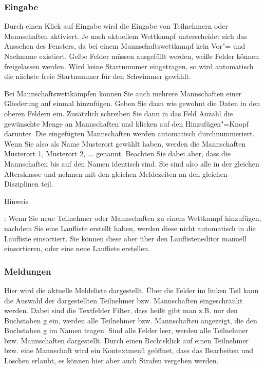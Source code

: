\documentclass[11pt,a4paper,twoside,ngerman]{article}
\begin{document}
\subsubsection*{Eingabe}
Durch einen Klick auf \glqq{}Eingabe\grqq{} wird die Eingabe von Teilnehmern oder Mannschaften aktiviert. Je nach aktuellem Wettkampf unterscheidet sich das Aussehen des Fensters, da bei einem Mannschaftswettkampf kein Vor"= und Nachname existiert. Gelbe Felder müssen ausgefüllt werden, weiße Felder können freigelassen werden. Wird keine Startnummer eingetragen, so wird automatisch die nächste freie Startnummer für den Schwimmer gewählt.

Bei Mannschaftswettkämpfen können Sie auch mehrere Mannschaften einer Gliederung auf einmal hinzufügen. Geben Sie dazu wie gewohnt die Daten in den oberen Feldern ein. Zusätzlich schreiben Sie dann in das Feld Anzahl die gewünschte Menge an Mannschaften und klicken auf den Hinzufügen"=Knopf darunter. Die eingefügten Mannschaften werden automatisch durchnummeriert. Wenn Sie also als Name \glqq{}Musterort\grqq{} gewählt haben, werden die Mannschaften \glqq{}Musterort 1\grqq{}, \glqq{}Musterort 2\grqq{}, ... genannt. Beachten Sie dabei aber, dass die Mannschaften bis auf den Namen identisch sind. Sie sind also alle in der gleichen Altersklasse und nehmen mit den gleichen Meldezeiten an den gleichen Disziplinen teil.

\begin{bfseries}Hinweis\end{bfseries}: Wenn Sie neue Teilnehmer oder Mannschaften zu einem Wettkampf hinzufügen, nachdem Sie eine Laufliste erstellt haben, werden diese nicht automatisch in die Laufliste einsortiert. Sie können diese aber über den Lauflisteneditor manuell einsortieren, oder eine neue Laufliste erstellen.


\subsubsection*{Meldungen}
Hier wird die aktuelle Meldeliste dargestellt. Über die Felder im linken Teil kann die Auswahl der dargestellten Teilnehmer bzw. Mannschaften eingeschränkt werden. Dabei sind die Textfelder Filter, dass heißt gibt man z.B. nur den Buchstaben g ein, werden alle Teilnehmer bzw. Mannschaften angezeigt, die den Buchstaben g im Namen tragen. Sind alle Felder leer, werden alle Teilnehmer bzw. Mannschaften dargestellt. Durch einen Rechtsklick auf einen Teilnehmer bzw. eine Mannschaft wird ein Kontextmenü geöffnet, dass das Bearbeiten und Löschen erlaubt, es können hier aber auch Strafen vergeben werden.
\end{document}
